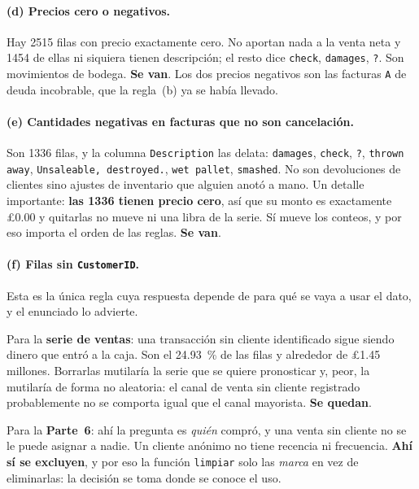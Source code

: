\documentclass[11pt]{article}
\newcommand{\gbp}{\pounds}
\begin{document}
\paragraph{(d) Precios cero o negativos.} Hay \num{2515} filas con precio
exactamente cero. No aportan nada a la venta neta y \num{1454} de ellas ni
siquiera tienen descripci\'on; el resto dice \texttt{check}, \texttt{damages},
\texttt{?}. Son movimientos de bodega. \textbf{Se van}. Los dos precios
negativos son las facturas \texttt{A} de deuda incobrable, que la regla~(b)
ya se hab\'ia llevado.

\paragraph{(e) Cantidades negativas en facturas que no son cancelaci\'on.}
Son \num{1336} filas, y la columna \texttt{Description} las delata:
\texttt{damages}, \texttt{check}, \texttt{?}, \texttt{thrown away},
\texttt{Unsaleable, destroyed.}, \texttt{wet pallet}, \texttt{smashed}. No
son devoluciones de clientes sino ajustes de inventario que alguien anot\'o a
mano. Un detalle importante: \textbf{las \num{1336} tienen precio cero}, as\'i
que su monto es exactamente \gbp\num{0.00} y quitarlas no mueve ni una libra
de la serie. S\'i mueve los conteos, y por eso importa el orden de las
reglas. \textbf{Se van}.

\paragraph{(f) Filas sin \texttt{CustomerID}.} Esta es la \'unica regla
cuya respuesta depende de para qu\'e se vaya a usar el dato, y el enunciado
lo advierte.

Para la \textbf{serie de ventas}: una transacci\'on sin cliente identificado
sigue siendo dinero que entr\'o a la caja. Son el \SI{24.93}{\percent} de las
filas y alrededor de \gbp\num{1.45} millones. Borrarlas mutilar\'ia la serie
que se quiere pronosticar y, peor, la mutilar\'ia de forma no aleatoria: el
canal de venta sin cliente registrado probablemente no se comporta igual que
el canal mayorista. \textbf{Se quedan}.

Para la \textbf{Parte~6}: ah\'i la pregunta es \emph{qui\'en} compr\'o, y una
venta sin cliente no se le puede asignar a nadie. Un cliente an\'onimo no
tiene recencia ni frecuencia. \textbf{Ah\'i s\'i se excluyen}, y por eso la
funci\'on \texttt{limpiar} solo las \emph{marca} en vez de eliminarlas: la
decisi\'on se toma donde se conoce el uso.
\end{document}

